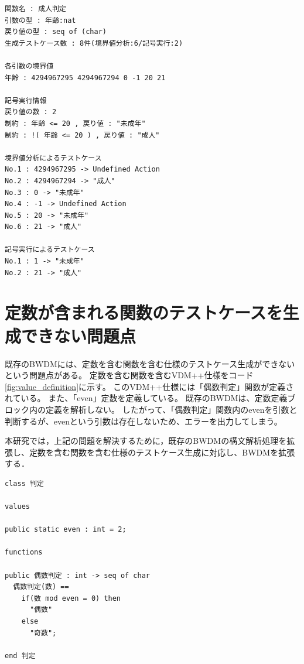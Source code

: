 \documentclass[uplatex, report, a4j, 10pt]{jsbook}
\newcommand{\tool}{BWDM}
\begin{document}
\lstset{language=}
\noindent\begin{minipage}{\textwidth}
  \begin{lstlisting}[caption=コード\ref{fig:func_multiple}のVDM++仕様を既存のBWDMに適用した際の出力。,label=fig:func_multiple_result]
関数名 : 成人判定
引数の型 : 年齢:nat 
戻り値の型 : seq of (char)
生成テストケース数 : 8件(境界値分析:6/記号実行:2)

各引数の境界値
年齢 : 4294967295 4294967294 0 -1 20 21 

記号実行情報
戻り値の数 : 2
制約 : 年齢 <= 20 , 戻り値 : "未成年"
制約 : !( 年齢 <= 20 ) , 戻り値 : "成人"

境界値分析によるテストケース
No.1 : 4294967295 -> Undefined Action
No.2 : 4294967294 -> "成人"
No.3 : 0 -> "未成年"
No.4 : -1 -> Undefined Action
No.5 : 20 -> "未成年"
No.6 : 21 -> "成人"

記号実行によるテストケース
No.1 : 1 -> "未成年"
No.2 : 21 -> "成人"
\end{lstlisting}
\end{minipage}

\section{定数が含まれる関数のテストケースを生成できない問題点}\label{sec:probrem_operation}
既存の\tool{}には、定数を含む関数を含む仕様のテストケース生成ができないという問題点がある。
定数を含む関数を含むVDM++仕様をコード\ref{fig:value_definition}に示す。
このVDM++仕様には「偶数判定」関数が定義されている。
また、「even」定数を定義している。
既存のBWDMは、定数定義ブロック内の定義を解析しない。
したがって、「偶数判定」関数内のevenを引数と判断するが、evenという引数は存在しないため、エラーを出力してしまう。

本研究では，上記の問題を解決するために，既存の\tool{}の構文解析処理を拡張し、定数を含む関数を含む仕様のテストケース生成に対応し、\tool{}を拡張する．

\lstset{language=}
\noindent\begin{minipage}{\textwidth}
  \begin{lstlisting}[caption=定数を含む関数を含むVDM++仕様。,label=fig:value_definition]
class 判定

values

public static even : int = 2;

functions

public 偶数判定 : int -> seq of char
  偶数判定(数) ==
    if(数 mod even = 0) then
      "偶数"
    else
      "奇数";

end 判定
\end{lstlisting}
\end{minipage}
\end{document}

